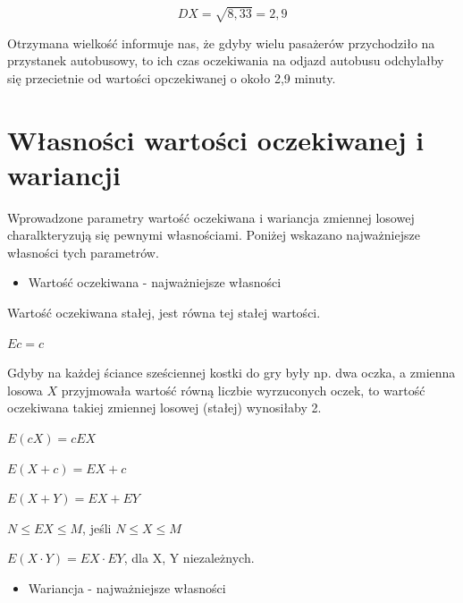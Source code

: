 \documentclass[
  letterpaper,
  DIV=11,
  numbers=noendperiod]{scrreprt}
\providecommand{\tightlist}{%
  \setlength{\itemsep}{0pt}\setlength{\parskip}{0pt}}\usepackage{longtable,booktabs,array}
\begin{document}
\[DX = \sqrt{8,33} = 2,9\]

Otrzymana wielkość informuje nas, że gdyby wielu pasażerów przychodziło
na przystanek autobusowy, to ich czas oczekiwania na odjazd autobusu
odchylałby się przecietnie od wartości opczekiwanej o około 2,9 minuty.

\begin{tcolorbox}[enhanced jigsaw, toprule=.15mm, title={***}, breakable, coltitle=black, titlerule=0mm, colbacktitle=quarto-callout-tip-color!10!white, opacitybacktitle=0.6, opacityback=0, bottomtitle=1mm, left=2mm, arc=.35mm, leftrule=.75mm, bottomrule=.15mm, rightrule=.15mm, toptitle=1mm, colframe=quarto-callout-tip-color-frame, colback=white]

\end{tcolorbox}

\section{Własności wartości oczekiwanej i
wariancji}\label{wux142asnoux15bci-wartoux15bci-oczekiwanej-i-wariancji}

Wprowadzone parametry wartość oczekiwana i wariancja zmiennej losowej
charalkteryzują się pewnymi własnościami. Poniżej wskazano najważniejsze
własności tych parametrów.

\begin{itemize}
\tightlist
\item
  Wartość oczekiwana - najważniejsze własności
\end{itemize}

Wartość oczekiwana stałej, jest równa tej stałej wartości.

\(Ec = c\)

Gdyby na każdej ściance sześciennej kostki do gry były np. dwa oczka, a
zmienna losowa \(X\) przyjmowała wartość równą liczbie wyrzuconych
oczek, to wartość oczekiwana takiej zmiennej losowej (stałej) wynosiłaby
2.

\(E(cX) = cEX\)

\(E(X+c) = EX +c\)

\(E(X+Y) = EX + EY\)

\(N \le EX \le M\), jeśli \(N \le X \le M\)

\(E(X\cdot Y)=EX \cdot EY\), dla X, Y niezależnych.

\begin{itemize}
\tightlist
\item
  Wariancja - najważniejsze własności
\end{itemize}
\end{document}
